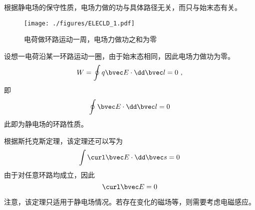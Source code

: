 

根据静电场的保守性质，电场力做的功与具体路径无关，而只与始末态有关。
\begin{figure}[ht]
\centering
\texttt{[image: ./figures/ELECLD\_1.pdf]}
\caption{电荷做环路运动一周，电场力做功之和为零} \label{ELECLD_fig1}
\end{figure}

设想一电荷沿某一环路运动一圈，由于始末态相同，因此电场力做功为零。
$$
W = \oint q\bvec E \cdot \dd \bvec l = 0~,
$$
即
\begin{equation}
\oint \bvec E \cdot \dd \bvec l = 0
\end{equation}
此即为静电场的环路性质。

根据斯托克斯定理，该定理还可以写为
$$\int \curl \bvec E \cdot \dd \bvec s = 0$$
由于对任意环路均成立，因此
\begin{equation}
\curl \bvec E = 0
\end{equation}

注意，该定理只适用于静电场情况。若存在变化的磁场等，则需要考虑电磁感应。